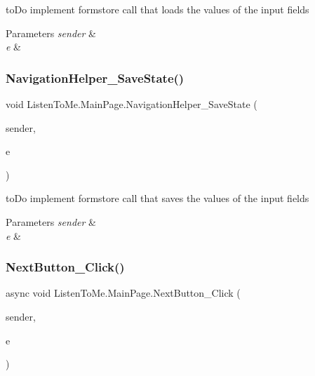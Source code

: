 to\+Do implement formstore call that loads the values of the input fields 


\begin{DoxyParams}{Parameters}
{\em sender} & \\
\hline
{\em e} & \\
\hline
\end{DoxyParams}
\mbox{\label{class_listen_to_me_1_1_main_page_aaf8102340fb741eaa5b6c501b423e060}} 
\subsubsection{\texorpdfstring{Navigation\+Helper\+\_\+\+Save\+State()}{NavigationHelper\_SaveState()}}
{\footnotesize\ttfamily void Listen\+To\+Me.\+Main\+Page.\+Navigation\+Helper\+\_\+\+Save\+State (\begin{DoxyParamCaption}\item[{object}]{sender,  }\item[{Save\+State\+Event\+Args}]{e }\end{DoxyParamCaption})\hspace{0.3cm}{\ttfamily [private]}}



to\+Do implement formstore call that saves the values of the input fields 


\begin{DoxyParams}{Parameters}
{\em sender} & \\
\hline
{\em e} & \\
\hline
\end{DoxyParams}
\mbox{\label{class_listen_to_me_1_1_main_page_a8144f2438fc2512708677190d74d2111}} 
\subsubsection{\texorpdfstring{Next\+Button\+\_\+\+Click()}{NextButton\_Click()}}
{\footnotesize\ttfamily async void Listen\+To\+Me.\+Main\+Page.\+Next\+Button\+\_\+\+Click (\begin{DoxyParamCaption}\item[{object}]{sender,  }\item[{Routed\+Event\+Args}]{e }\end{DoxyParamCaption})\hspace{0.3cm}{\ttfamily [private]}}



